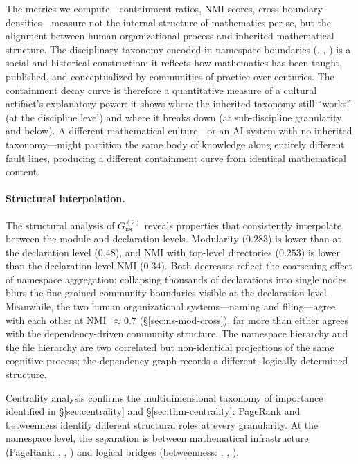 The metrics we compute---containment ratios, NMI scores, cross-boundary densities---measure not the internal structure of mathematics per se, but the alignment between human organizational process and inherited mathematical structure. The disciplinary taxonomy encoded in namespace boundaries (, , ) is a social and historical construction: it reflects how mathematics has been taught, published, and conceptualized by communities of practice over centuries. The containment decay curve is therefore a quantitative measure of a cultural artifact's explanatory power: it shows where the inherited taxonomy still ``works'' (at the discipline level) and where it breaks down (at sub-discipline granularity and below). A different mathematical culture---or an AI system with no inherited taxonomy---might partition the same body of knowledge along entirely different fault lines, producing a different containment curve from identical mathematical content.

\paragraph{Structural interpolation.} The structural analysis of $G_{\mathrm{ns}}^{(2)}$ reveals properties that consistently interpolate between the module and declaration levels. Modularity ($0.283$) is lower than at the declaration level ($0.48$), and NMI with top-level directories ($0.253$) is lower than the declaration-level NMI ($0.34$). Both decreases reflect the coarsening effect of namespace aggregation: collapsing thousands of declarations into single nodes blurs the fine-grained community boundaries visible at the declaration level. Meanwhile, the two human organizational systems---naming and filing---agree with each other at NMI~$\approx 0.7$ (\S\ref{sec:ns-mod-cross}), far more than either agrees with the dependency-driven community structure. The namespace hierarchy and the file hierarchy are two correlated but non-identical projections of the same cognitive process; the dependency graph records a different, logically determined structure.

Centrality analysis confirms the multidimensional taxonomy of importance identified in \S\ref{sec:centrality} and \S\ref{sec:thm-centrality}: PageRank and betweenness identify different structural roles at every granularity. At the namespace level, the separation is between mathematical infrastructure (PageRank: , , ) and logical bridges (betweenness: , , ).

